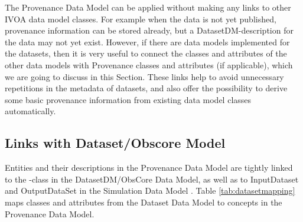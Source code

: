 

The Provenance Data Model can be applied without making any links to other 
IVOA data model classes. For example when the data is not yet published, provenance information
can be stored already, but a DatasetDM-description for the data may not yet exist.
However, if there are data models implemented for the datasets, then it is 
very useful to connect the classes and attributes of the other data models with Provenance classes and attributes (if applicable), which we are going to discuss in this Section. These links help to avoid 
unnecessary repetitions in the metadata of datasets, and also offer the possibility 
to derive some basic provenance information from existing data model classes automatically.


\subsection{Links with Dataset/Obscore Model}
Entities and their descriptions in the Provenance Data Model 
are tightly linked to the -class in the DatasetDM/ObsCore Data Model, as well as to 
InputDataset and OutputDataSet in the Simulation Data Model \citep[SimDM,][]{std:SimDM}.
Table \ref{tab:datasetmapping} maps classes and attributes from the Dataset Data Model 
to concepts in the Provenance Data Model.



